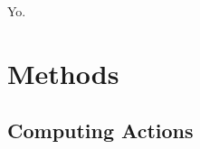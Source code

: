 \documentclass[modern]{aastex63}
\newcommand{\gaia}{\textsl{Gaia}}
\newcommand{\dr}[1]{\acronym{DR}#1}
\newcommand{\apogee}{\acronym{APOGEE}}
\begin{document}


Yo.


\section{Methods}
\label{sec:methods}

\subsection{Computing Actions}
\label{sec:est-actions}
\end{document}
